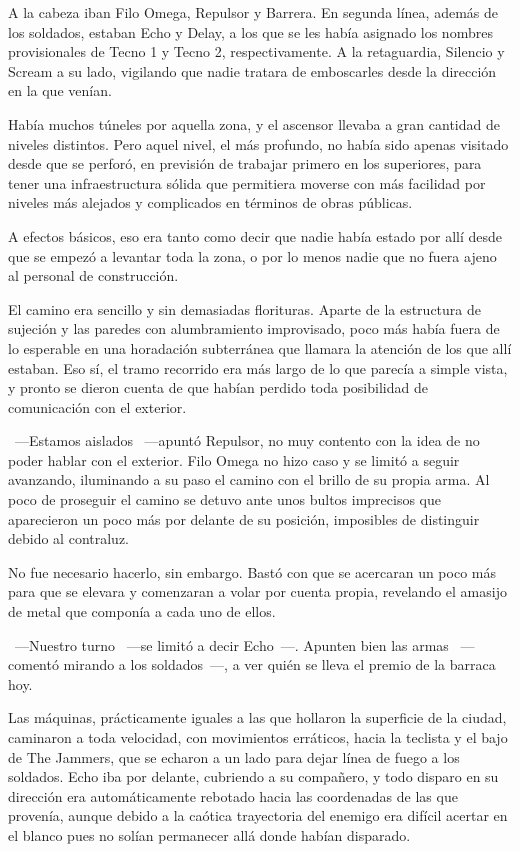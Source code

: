 A la cabeza iban Filo Omega, Repulsor y Barrera. En segunda línea, además de los soldados, estaban Echo y Delay, a los que se les había asignado los nombres provisionales de Tecno 1 y Tecno 2, respectivamente. A la retaguardia, Silencio y Scream a su lado, vigilando que nadie tratara de emboscarles desde la dirección en la que venían.

Había muchos túneles por aquella zona, y el ascensor llevaba a gran cantidad de niveles distintos. Pero aquel nivel, el más profundo, no había sido apenas visitado desde que se perforó, en previsión de trabajar primero en los superiores, para tener una infraestructura sólida que permitiera moverse con más facilidad por niveles más alejados y complicados en términos de obras públicas.

A efectos básicos, eso era tanto como decir que nadie había estado por allí desde que se empezó a levantar toda la zona, o por lo menos nadie que no fuera ajeno al personal de construcción.

El camino era sencillo y sin demasiadas florituras. Aparte de la estructura de sujeción y las paredes con alumbramiento improvisado, poco más había fuera de lo esperable en una horadación subterránea que llamara la atención de los que allí estaban. Eso sí, el tramo recorrido era más largo de lo que parecía a simple vista, y pronto se dieron cuenta de que habían perdido toda posibilidad de comunicación con el exterior.

~---Estamos aislados ~---apuntó Repulsor, no muy contento con la idea de no poder hablar con el exterior. Filo Omega no hizo caso y se limitó a seguir avanzando, iluminando a su paso el camino con el brillo de su propia arma. Al poco de proseguir el camino se detuvo ante unos bultos imprecisos que aparecieron un poco más por delante de su posición, imposibles de distinguir debido al contraluz.

No fue necesario hacerlo, sin embargo. Bastó con que se acercaran un poco más para que se elevara y comenzaran a volar por cuenta propia, revelando el amasijo de metal que componía a cada uno de ellos.

~---Nuestro turno ~---se limitó a decir Echo~---. Apunten bien las armas ~---comentó mirando a los soldados~---, a ver quién se lleva el premio de la barraca hoy.

Las máquinas, prácticamente iguales a las que hollaron la superficie de la ciudad, caminaron a toda velocidad, con movimientos erráticos, hacia la teclista y el bajo de The Jammers, que se echaron a un lado para dejar línea de fuego a los soldados. Echo iba por delante, cubriendo a su compañero, y todo disparo en su dirección era automáticamente rebotado hacia las coordenadas de las que provenía, aunque debido a la caótica trayectoria del enemigo era difícil acertar en el blanco pues no solían permanecer allá donde habían disparado.


